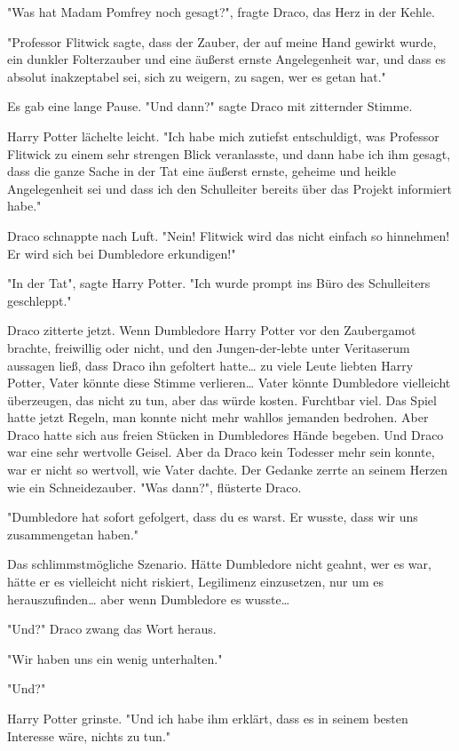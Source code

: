 {"Was hat Madam Pomfrey noch gesagt?", fragte Draco, das Herz in der Kehle.

"Professor Flitwick sagte, dass der Zauber, der auf meine Hand gewirkt wurde, ein dunkler Folterzauber und eine äußerst ernste Angelegenheit war, und dass es absolut inakzeptabel sei, sich zu weigern, zu sagen, wer es getan hat."

Es gab eine lange Pause. "Und dann?" sagte Draco mit zitternder Stimme.

Harry Potter lächelte leicht. "Ich habe mich zutiefst entschuldigt, was Professor Flitwick zu einem sehr strengen Blick veranlasste, und dann habe ich ihm gesagt, dass die ganze Sache in der Tat eine äußerst ernste, geheime und heikle Angelegenheit sei und dass ich den Schulleiter bereits über das Projekt informiert habe."

Draco schnappte nach Luft. "Nein! Flitwick wird das nicht einfach so hinnehmen! Er wird sich bei Dumbledore erkundigen!"

"In der Tat", sagte Harry Potter. "Ich wurde prompt ins Büro des Schulleiters geschleppt."

Draco zitterte jetzt. Wenn Dumbledore Harry Potter vor den Zaubergamot brachte, freiwillig oder nicht, und den Jungen-der-lebte unter Veritaserum aussagen ließ, dass Draco ihn gefoltert hatte… zu viele Leute liebten Harry Potter, Vater könnte diese Stimme verlieren… Vater könnte Dumbledore vielleicht überzeugen, das nicht zu tun, aber das würde kosten. Furchtbar viel. Das Spiel hatte jetzt Regeln, man konnte nicht mehr wahllos jemanden bedrohen. Aber Draco hatte sich aus freien Stücken in Dumbledores Hände begeben. Und Draco war eine sehr wertvolle Geisel. Aber da Draco kein Todesser mehr sein konnte, war er nicht so wertvoll, wie Vater dachte. Der Gedanke zerrte an seinem Herzen wie ein Schneidezauber. "Was dann?", flüsterte Draco.

"Dumbledore hat sofort gefolgert, dass du es warst. Er wusste, dass wir uns zusammengetan haben."

Das schlimmstmögliche Szenario. Hätte Dumbledore nicht geahnt, wer es war, hätte er es vielleicht nicht riskiert, Legilimenz einzusetzen, nur um es herauszufinden… aber wenn Dumbledore es wusste…

"Und?" Draco zwang das Wort heraus.

"Wir haben uns ein wenig unterhalten."

"Und?"

Harry Potter grinste. "Und ich habe ihm erklärt, dass es in seinem besten Interesse wäre, nichts zu tun."

}
